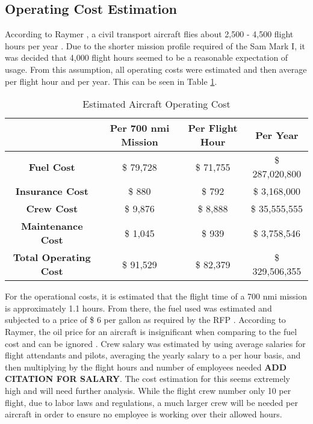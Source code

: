 \subsection{Operating Cost Estimation}

According to Raymer \cite{raymer}, a civil transport aircraft flies about 2,500 - 4,500 flight hours per year \cite{raymer}. Due to the shorter mission profile required of the Sam Mark I, it was decided that 4,000 flight hours seemed to be a reasonable expectation of usage. From this assumption, all operating costs were estimated and then average per flight hour and per year. This can be seen in Table \ref{tab:opcost}.

\begin{table}[!h]
    \centering
        \caption{Estimated Aircraft Operating Cost}
    \begin{tabular}{|c||c|c|c|}\toprule
         & \textbf{Per 700 nmi Mission} & \textbf{Per Flight Hour} & \textbf{Per Year} \\\hline \hline
         \textbf{Fuel Cost} & \$ 79,728 & \$ 71,755 & \$ 287,020,800 \\ \hline
         \textbf{Insurance Cost} & \$ 880 & \$ 792 & \$ 3,168,000 \\ \hline
         \textbf{Crew Cost} &  \$ 9,876  & \$ 8,888 & \$ 35,555,555 \\ \hline
         \textbf{Maintenance Cost} & \$ 1,045 & \$ 939 & \$ 3,758,546  \\ \hline
         \textbf{Total Operating Cost} &  \$ 91,529 &  \$ 82,379 &  \$ 329,506,355 \\\bottomrule
    \end{tabular}
    \label{tab:opcost}
\end{table}

For the operational costs, it is estimated that the flight time of a 700 nmi mission is approximately 1.1 hours. From there, the fuel used was estimated and subjected to a price of \$ 6 per gallon as required by the RFP \cite{RFP}. According to Raymer, the oil price for an aircraft is insignificant when comparing to the fuel cost and can be ignored \cite{raymer}. Crew salary was estimated by using average salaries for flight attendants and pilots, averaging the yearly salary to a per hour basis, and then multiplying by the flight hours and number of employees needed \textbf{ADD CITATION FOR SALARY}. The cost estimation for this seems extremely high and will need further analysis. While the flight crew number only 10 per flight, due to labor laws and regulations, a much larger crew will be needed per aircraft in order to ensure no employee is working over their allowed hours. 

